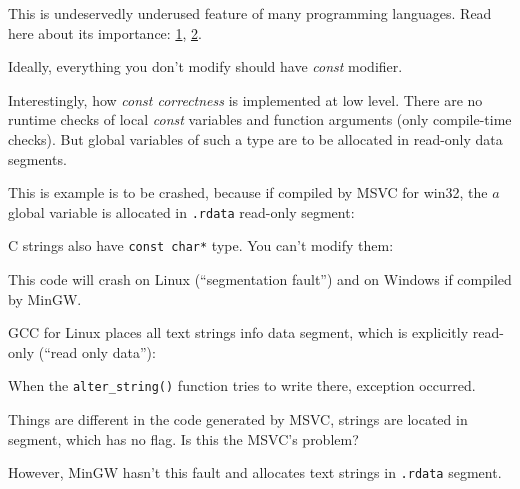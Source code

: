 \label{const_in_rdata}

This is undeservedly underused feature of many programming languages.
Read here about its importance:
\href{https://isocpp.org/wiki/faq/const-correctness}{1},
\href{https://stackoverflow.com/questions/136880/sell-me-on-const-correctness}{2}.

Ideally, everything you don't modify should have \emph{const} modifier.

Interestingly, how \emph{const correctness} is implemented at low level.
There are no runtime checks of local \emph{const} variables and function arguments (only compile-time checks).
But global variables of such a type are to be allocated in read-only data segments.

This is example is to be crashed, because if compiled by MSVC for win32,
the $a$ global variable is allocated in \verb|.rdata| read-only segment:



C strings also have \verb|const char*| type.
You can't modify them:



This code will crash on Linux (``segmentation fault'') and on Windows if compiled by MinGW.

GCC for Linux places all text strings info  data segment, which is explicitly read-only
(``read only data''):



When the \verb|alter_string()| function tries to write there, exception occurred.

Things are different in the code generated by MSVC, strings are located in  segment, which has no  flag.
Is this the MSVC's problem?



However, MinGW hasn't this fault and allocates text strings in \verb|.rdata| segment.



